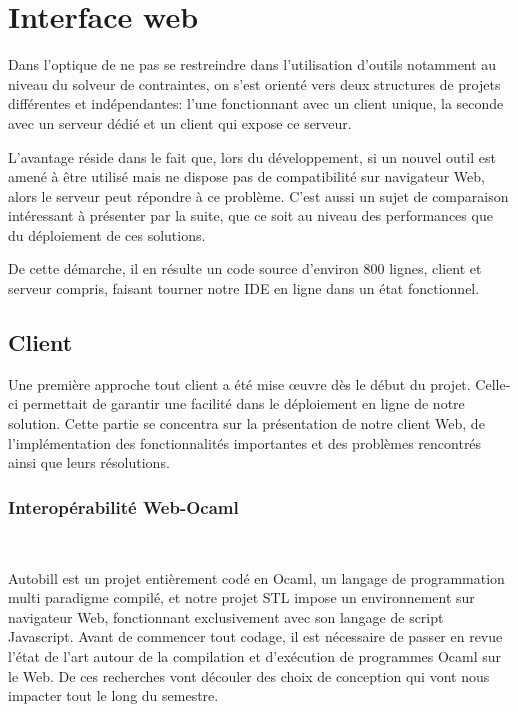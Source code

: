\documentclass[12pt]{article}
\begin{document}
\newpage

\hypertarget{interface-web}{%
      \section{Interface web}\label{interface-web}}

Dans l'optique de ne pas se restreindre dans l'utilisation d'outils
notamment au niveau du solveur de contraintes, on s'est orienté
vers deux structures de projets différentes et indépendantes: l'une
fonctionnant avec un client unique, la seconde avec un serveur dédié et
un client qui expose ce serveur.

L'avantage réside dans le fait que, lors du développement, si un nouvel
outil est amené à être utilisé mais ne dispose pas de compatibilité sur
navigateur Web, alors le serveur peut répondre à ce problème. C'est
aussi un sujet de comparaison intéressant à présenter par la suite, que
ce soit au niveau des performances que du déploiement de ces solutions.

De cette démarche, il en résulte un code source d'environ 800 lignes,
client et serveur compris, faisant tourner notre IDE en ligne dans un
état fonctionnel.

\subsection{Client}

Une première approche tout client a été mise œuvre dès le début du
projet. Celle-ci permettait de garantir une facilité dans le déploiement
en ligne de notre solution. Cette partie se concentra sur la présentation de
notre client Web, de l'implémentation des fonctionnalités importantes et des problèmes rencontrés ainsi que leurs résolutions.

\subsubsection{Interopérabilité Web-Ocaml}\

Autobill est un projet entièrement codé en Ocaml, un langage de programmation multi paradigme compilé, et notre projet STL impose un environnement sur navigateur Web, fonctionnant exclusivement avec son langage de script Javascript. Avant de commencer tout codage, il est nécessaire de passer en revue l'état de l'art autour de la compilation et d'exécution de programmes Ocaml sur le Web. De ces recherches vont découler  des choix de conception qui vont nous impacter tout le long du semestre. \\
\end{document}
